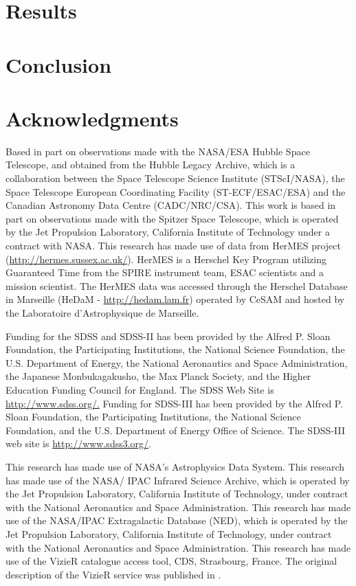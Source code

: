 \documentclass[preprint,natbib209]{aastex}
\begin{document}
\section{Results}
\label{sec:discussion}



\section{Conclusion}
\label{sec:conclusion}



\acknowledgments
\section*{Acknowledgments}
Based in part on observations made with the NASA/ESA Hubble Space Telescope, 
and obtained from the Hubble Legacy Archive, which is a collaboration between
the Space Telescope Science Institute (STScI/NASA), the Space Telescope 
European Coordinating Facility (ST-ECF/ESAC/ESA) and the 
Canadian Astronomy Data Centre (CADC/NRC/CSA). 
This work is based in part on observations made with the Spitzer Space Telescope, 
which is operated by the Jet Propulsion Laboratory, California Institute of Technology under a contract with NASA.
This research has made use of data from HerMES project (\url{http://hermes.sussex.ac.uk/}). 
HerMES is a Herschel Key Program utilizing Guaranteed Time from the SPIRE instrument team,
ESAC scientists and a mission scientist.
The HerMES data was accessed through the Herschel Database in 
Marseille (HeDaM - \url{http://hedam.lam.fr}) operated by CeSAM and
hosted by the Laboratoire d'Astrophysique de Marseille.

Funding for the SDSS and SDSS-II has been provided by the Alfred P. Sloan Foundation, 
the Participating Institutions, the National Science Foundation, the U.S. Department of Energy, 
the National Aeronautics and Space Administration, the Japanese Monbukagakusho, 
the Max Planck Society, and the Higher Education Funding Council for England. 
The SDSS Web Site is \url{http://www.sdss.org/.}
Funding for SDSS-III has been provided by the Alfred P. Sloan Foundation, the Participating Institutions, 
the National Science Foundation, and the U.S. Department of Energy Office of Science. 
The SDSS-III web site is \url{http://www.sdss3.org/}.

This research has made use of NASA's Astrophysics Data System.
This research has made use of the NASA/ IPAC Infrared Science Archive, 
which is operated by the Jet Propulsion Laboratory, California Institute of Technology, 
under contract with the National Aeronautics and Space Administration.
This research has made use of the NASA/IPAC Extragalactic Database (NED), 
which is operated by the Jet Propulsion Laboratory, California Institute of Technology, 
under contract with the National Aeronautics and Space Administration.
This research has made use of the VizieR catalogue access tool, CDS,
Strasbourg, France. The original description of the VizieR service was
published in \cite{vizier}.
\end{document}
